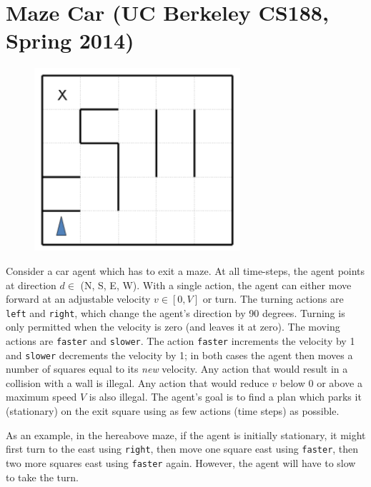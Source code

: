 \documentclass[11pt, a4paper]{article}
\begin{document}
\newpage

\section{Maze Car (UC Berkeley CS188, Spring 2014)}

\begin{figure}[h]
    \centering
    \includegraphics[width=0.3\linewidth]{figures/e1_maze.png}
\end{figure}

Consider a car agent which has to exit a maze. At all time-steps, the agent points at direction $d \in$ (N, S, E, W). With a single action, the agent can either move forward at an adjustable velocity $v \in [0, V]$ or turn. The turning actions are \texttt{left} and \texttt{right}, which change the agent's direction by 90 degrees. Turning is only permitted when the velocity is zero (and leaves it at zero). The moving actions are \texttt{faster} and \texttt{slower}. The action \texttt{faster} increments the velocity by 1 and \texttt{slower} decrements the velocity by 1; in both cases the agent then moves a number of squares equal to its \emph{new} velocity. Any action that would result in a collision with a wall is illegal. Any action that would reduce $v$ below 0 or above a maximum speed $V$ is also illegal. The agent's goal is to find a plan which parks it (stationary) on the exit square using as few actions (time steps) as possible.

As an example, in the hereabove maze, if the agent is initially stationary, it might first turn to the east using \texttt{right}, then move one square east using \texttt{faster}, then two more squares east using \texttt{faster} again. However, the agent will have to slow to take the turn.
\end{document}
